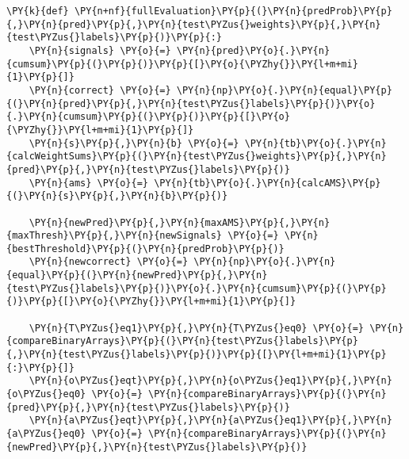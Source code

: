 {\par%
\vspace{-1\baselineskip}%
}%
\begin{notebookcell}[]%
\begin{addmargin}[\cellleftmargin]{0em}%
{\smaller%
\par%
%
\vspace{-1\smallerfontscale}%
\begin{Verbatim}[commandchars=\\\{\}]
\PY{k}{def} \PY{n+nf}{fullEvaluation}\PY{p}{(}\PY{n}{predProb}\PY{p}{,}\PY{n}{pred}\PY{p}{,}\PY{n}{test\PYZus{}weights}\PY{p}{,}\PY{n}{test\PYZus{}labels}\PY{p}{)}\PY{p}{:}
    \PY{n}{signals} \PY{o}{=} \PY{n}{pred}\PY{o}{.}\PY{n}{cumsum}\PY{p}{(}\PY{p}{)}\PY{p}{[}\PY{o}{\PYZhy{}}\PY{l+m+mi}{1}\PY{p}{]}
    \PY{n}{correct} \PY{o}{=} \PY{n}{np}\PY{o}{.}\PY{n}{equal}\PY{p}{(}\PY{n}{pred}\PY{p}{,}\PY{n}{test\PYZus{}labels}\PY{p}{)}\PY{o}{.}\PY{n}{cumsum}\PY{p}{(}\PY{p}{)}\PY{p}{[}\PY{o}{\PYZhy{}}\PY{l+m+mi}{1}\PY{p}{]}    
    \PY{n}{s}\PY{p}{,}\PY{n}{b} \PY{o}{=} \PY{n}{tb}\PY{o}{.}\PY{n}{calcWeightSums}\PY{p}{(}\PY{n}{test\PYZus{}weights}\PY{p}{,}\PY{n}{pred}\PY{p}{,}\PY{n}{test\PYZus{}labels}\PY{p}{)}
    \PY{n}{ams} \PY{o}{=} \PY{n}{tb}\PY{o}{.}\PY{n}{calcAMS}\PY{p}{(}\PY{n}{s}\PY{p}{,}\PY{n}{b}\PY{p}{)}
   
    \PY{n}{newPred}\PY{p}{,}\PY{n}{maxAMS}\PY{p}{,}\PY{n}{maxThresh}\PY{p}{,}\PY{n}{newSignals} \PY{o}{=} \PY{n}{bestThreshold}\PY{p}{(}\PY{n}{predProb}\PY{p}{)}
    \PY{n}{newcorrect} \PY{o}{=} \PY{n}{np}\PY{o}{.}\PY{n}{equal}\PY{p}{(}\PY{n}{newPred}\PY{p}{,}\PY{n}{test\PYZus{}labels}\PY{p}{)}\PY{o}{.}\PY{n}{cumsum}\PY{p}{(}\PY{p}{)}\PY{p}{[}\PY{o}{\PYZhy{}}\PY{l+m+mi}{1}\PY{p}{]}
    
    \PY{n}{T\PYZus{}eq1}\PY{p}{,}\PY{n}{T\PYZus{}eq0} \PY{o}{=} \PY{n}{compareBinaryArrays}\PY{p}{(}\PY{n}{test\PYZus{}labels}\PY{p}{,}\PY{n}{test\PYZus{}labels}\PY{p}{)}\PY{p}{[}\PY{l+m+mi}{1}\PY{p}{:}\PY{p}{]}
    \PY{n}{o\PYZus{}eqt}\PY{p}{,}\PY{n}{o\PYZus{}eq1}\PY{p}{,}\PY{n}{o\PYZus{}eq0} \PY{o}{=} \PY{n}{compareBinaryArrays}\PY{p}{(}\PY{n}{pred}\PY{p}{,}\PY{n}{test\PYZus{}labels}\PY{p}{)}
    \PY{n}{a\PYZus{}eqt}\PY{p}{,}\PY{n}{a\PYZus{}eq1}\PY{p}{,}\PY{n}{a\PYZus{}eq0} \PY{o}{=} \PY{n}{compareBinaryArrays}\PY{p}{(}\PY{n}{newPred}\PY{p}{,}\PY{n}{test\PYZus{}labels}\PY{p}{)}
    

\end{Verbatim}}
\end{addmargin}
\end{notebookcell}
